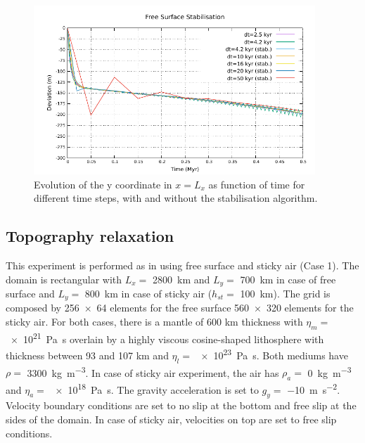 \documentclass[hidelinks,10pt,a4paper]{article}
\begin{document}
\begin{figure}
\centering
\noindent\includegraphics[width=400px]{./Figures/Kaus_random.pdf}
\caption{Evolution of the y coordinate in $x=L_x$ as function of time for different time steps, with and without the stabilisation algorithm.}
\label{fig:stab}
\end{figure}

\subsection{Topography relaxation}\label{sec:crameri}
This experiment is performed as in \citet{Crameri2012} using free surface and sticky air (Case 1). The domain is rectangular with $L_x=$ \SI{2800}{\km} and
$L_y=$ \SI{700}{\km} in case of free surface and $L_y=$ \SI{800}{\km} in case of sticky air ($h_{st}=$ \SI{100}{\km}). The grid is composed by \num{256x64}
elements for the free surface \num{560x320} elements for the sticky air. For both cases, there is a mantle of 600 km thickness with $\eta_m=$ \SI{e21}{\pascal\s}
overlain by a highly viscous cosine-shaped lithosphere with thickness between 93 and 107 km and $\eta_l=$ \SI{e23}{\pascal\s}. Both mediums have $\rho=$
\SI{3300}{\kg\per\cubic\metre}. In case of sticky air experiment, the air has $\rho_a=$ \SI{0}{\kg\per\cubic\metre} and $\eta_a=$ \SI{e18}{\pascal\s}. The
gravity acceleration is set to $g_y=$ \SI{-10}{\metre\per\square\s}. Velocity boundary conditions are set to no slip at the bottom and free slip at the sides
of the domain. In case of sticky air, velocities on top are set to free slip conditions.
\end{document}
